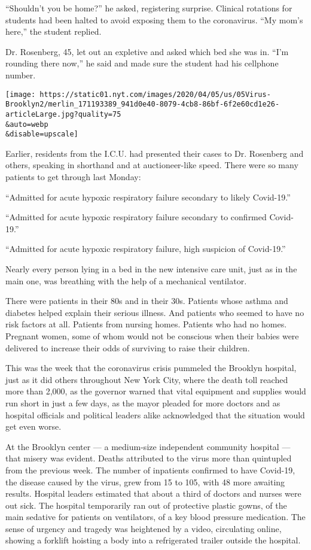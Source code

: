 ``Shouldn't you be home?'' he asked, registering surprise. Clinical
rotations for students had been halted to avoid exposing them to the
coronavirus. ``My mom's here,'' the student replied.

Dr. Rosenberg, 45, let out an expletive and asked which bed she was in.
``I'm rounding there now,'' he said and made sure the student had his
cellphone number.

\texttt{[image: https://static01.nyt.com/images/2020/04/05/us/05Virus-Brooklyn2/merlin\_171193389\_941d0e40-8079-4cb8-86bf-6f2e60cd1e26-articleLarge.jpg?quality=75\\\&auto=webp\\\&disable=upscale]}

Earlier, residents from the I.C.U. had presented their cases to Dr.
Rosenberg and others, speaking in shorthand and at auctioneer-like
speed. There were so many patients to get through last Monday:

``Admitted for acute hypoxic respiratory failure secondary to likely
Covid-19.''

``Admitted for acute hypoxic respiratory failure secondary to confirmed
Covid-19.''

``Admitted for acute hypoxic respiratory failure, high suspicion of
Covid-19.''

Nearly every person lying in a bed in the new intensive care unit, just
as in the main one, was breathing with the help of a mechanical
ventilator.

There were patients in their 80s and in their 30s. Patients whose asthma
and diabetes helped explain their serious illness. And patients who
seemed to have no risk factors at all. Patients from nursing homes.
Patients who had no homes. Pregnant women, some of whom would not be
conscious when their babies were delivered to increase their odds of
surviving to raise their children.

This was the week that the coronavirus crisis pummeled the Brooklyn
hospital, just as it did others throughout New York City, where the
death toll reached more than 2,000, as the governor warned that vital
equipment and supplies would run short in just a few days, as the mayor
pleaded for more doctors and as hospital officials and political leaders
alike acknowledged that the situation would get even worse.

At the Brooklyn center --- a medium-size independent community hospital
--- that misery was evident. Deaths attributed to the virus more than
quintupled from the previous week. The number of inpatients confirmed to
have Covid-19, the disease caused by the virus, grew from 15 to 105,
with 48 more awaiting results. Hospital leaders estimated that about a
third of doctors and nurses were out sick. The hospital temporarily ran
out of protective plastic gowns, of the main sedative for patients on
ventilators, of a key blood pressure medication. The sense of urgency
and tragedy was heightened by a video, circulating online, showing a
forklift hoisting a body into a refrigerated trailer outside the
hospital.

